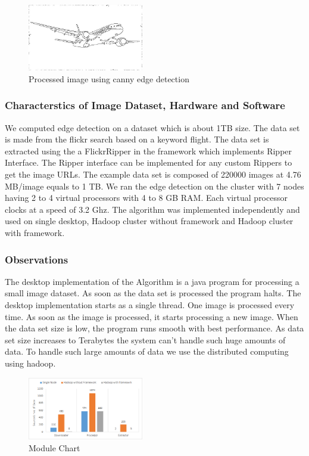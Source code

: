 \documentclass[conference]{IEEEtran}
\begin{document}
\begin{figure}[h]
	\centering
	\includegraphics[width=0.45\textwidth]{output-canny}
	\caption{Processed image using canny edge detection}
	\label{fig:output-canny}
\end{figure}

\subsubsection{Characterstics of Image Dataset, Hardware and Software}
We computed edge detection on a dataset which is about 1TB size. The data set is made from the flickr search based on a keyword flight. The data set is extracted using the a FlickrRipper in the framework which implements Ripper Interface. The Ripper interface can be implemented for any custom Rippers to get the image URLs. The example data set is composed of 220000 images at 4.76 MB/image equals to 1 TB. We ran the edge detection on the cluster with 7 nodes having 2 to 4 virtual processors with 4 to 8 GB RAM. Each virtual processor clocks at a speed of 3.2 Ghz. The algorithm was implemented independently and used on single desktop, Hadoop cluster without framework and Hadoop cluster with framework.

\subsubsection{Observations}   

The desktop implementation of the Algorithm is a java program for processing a small image dataset. As soon as the data set is processed the program halts. The desktop implementation starts as a single thread. One image is processed every time. As soon as the image is processed, it starts processing a new image. When the data set size is low, the program runs smooth with best performance. As data set size increases to Terabytes the system can't handle such huge amounts of data. To handle such large amounts of data we use the distributed computing using hadoop.


\begin{figure}[h]
	\centering
	\includegraphics[width=0.45\textwidth]{module-chart}
	\caption{Module Chart}
	\label{fig:module-chart}
\end{figure}
 
\end{document}
